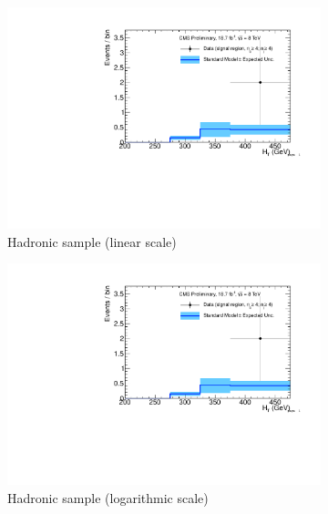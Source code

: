 \clearpage
\begin{figure}[h!]
  \centering
  \begin{subfigure}[b]{0.48\textwidth}
    \includegraphics[width=\textwidth,page=1]
    {Figs/results/v0/blueBand/bestFit_2012dev_RQcdZero_fZinvAll_ge4b_ge4j-1h_smOnly}
    \caption{Hadronic sample (linear scale)}
  \end{subfigure}
  \begin{subfigure}[b]{0.48\textwidth}
    \includegraphics[width=\textwidth,page=2]
    {Figs/results/v0/blueBand/bestFit_2012dev_RQcdZero_fZinvAll_ge4b_ge4j-1h_smOnly}
    \caption{Hadronic sample (logarithmic scale)}
  \end{subfigure}
  \begin{subfigure}[b]{0.48\textwidth}

\end{subfigure}
\end{figure}
